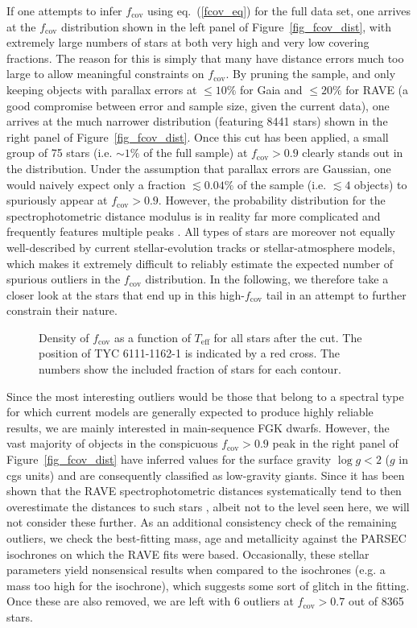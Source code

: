 \documentclass[twocolumn]{aastex6}
\begin{document}
If one attempts to infer $f_\mathrm{cov}$ using eq.~(\ref{fcov_eq}) for the full data set, one arrives at the $f_\mathrm{cov}$ distribution shown in the left panel of Figure~\ref{fig_fcov_dist}, with extremely large numbers of stars at both very high and very low covering fractions. The reason for this is simply that many have distance errors much too large to allow meaningful constraints on $f_\mathrm{cov}$. By pruning the sample, and only keeping objects with parallax errors at $\leq 10\%$ for Gaia and  $\leq 20\%$ for RAVE (a good compromise between error and sample size, given the current data), one arrives at the much narrower distribution (featuring 8441 stars) shown in the right panel of Figure~\ref{fig_fcov_dist}. Once this cut has been applied, a small group of 75 stars (i.e. $\sim 1\%$ of the full sample) at $f_\mathrm{cov} > 0.9$ clearly stands out in the distribution. Under the assumption that parallax errors are Gaussian, one would naively expect only a fraction $\lesssim 0.04\%$ of the sample (i.e. $\lesssim 4$ objects) to spuriously appear at $f_\mathrm{cov}>0.9$. However, the probability distribution for the spectrophotometric distance modulus is in reality far more complicated and frequently features multiple peaks \citep[e.g.][]{Binney14}. All types of stars are moreover not equally well-described by current stellar-evolution tracks or stellar-atmosphere models, which makes it extremely difficult to reliably estimate the expected number of spurious outliers in the $f_\mathrm{cov}$ distribution. In the  following, we therefore take a closer look at the stars that end up in this high-$f_\mathrm{cov}$ tail in an attempt to further constrain their nature. 
\begin{figure}[t]
\caption{Density of $f_\mathrm{cov}$ as a function of $T_\mathrm{eff}$ for all stars after the cut. The position of TYC 6111-1162-1 is indicated by a red cross. The numbers show the included fraction of stars for each contour.} 
\label{fig_fcov_Teff}
\end{figure}


Since the most interesting outliers would be those that belong to a spectral type for which current models are generally expected to produce highly reliable results, we are mainly interested in main-sequence FGK dwarfs. However, the vast majority of objects in the conspicuous $f_\mathrm{cov}>0.9$ peak in the right panel of Figure~\ref{fig_fcov_dist} have inferred values for the surface gravity $\log g < 2$ ($g$ in cgs units) and are consequently classified as low-gravity giants. Since it has been shown that the RAVE spectrophotometric distances systematically tend to then overestimate the distances to such stars \citep{Binney14}, albeit not to the level seen here, we will not consider these further. As an additional consistency check of the remaining outliers, we check the best-fitting mass, age and metallicity against the PARSEC \citep{2012MNRAS.427..127B} isochrones on which the RAVE fits were based. Occasionally, these stellar parameters yield nonsensical results when compared to the isochrones (e.g. a mass too high for the isochrone), which suggests some sort of glitch in the fitting. Once these are also removed, we are left with 6 outliers at $f_\mathrm{cov}>0.7$ out of 8365 stars. 
\end{document}
